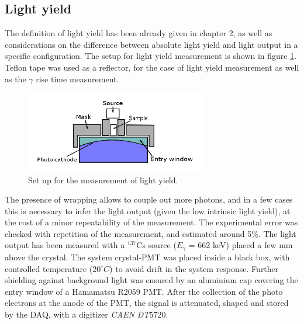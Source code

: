 \subsection{Light yield}
The definition of light yield has been already given in chapter 2, as well as considerations on the difference between absolute light yield and light output in a specific configuration. The setup for light yield measurement is shown in figure \ref{fig:set_LY}. 
Teflon tape was used as a reflector, for the case of light yield measurement as well as the $\gamma$ rise time measurement. 
\begin{figure}[htbp]
\begin{center}
\includegraphics[width=8cm]{../Pictures/Chapter_5/LY_3.png}
\end{center}
\caption[Light Yield setup]{Set up for the measurement of light yield.}
\label{fig:set_LY}
\end{figure}
The presence of wrapping allows to couple out more photons, and in a few cases this is necessary to infer the light output (given the low intrinsic light yield), at the cost of a minor repeatability of the measurement. The experimental error was checked with repetition of the measurement, and estimated around 5$\%$.
The light output has been measured with a $^{137}$Cs source ($E_{\gamma}$ = 662 keV) placed a few mm above the crystal. The system crystal-PMT was placed inside a black box, with controlled temperature ($20^{\circ}C$) to avoid drift in the system response.
Further shielding against background light was ensured by an aluminium cap covering the entry window of a Hamamatsu R2059 PMT.
After the collection of the photo electrons at the anode of the PMT, the signal is attenuated, shaped and stored by the DAQ, with a digitizer \textit{CAEN DT$5720$}.

